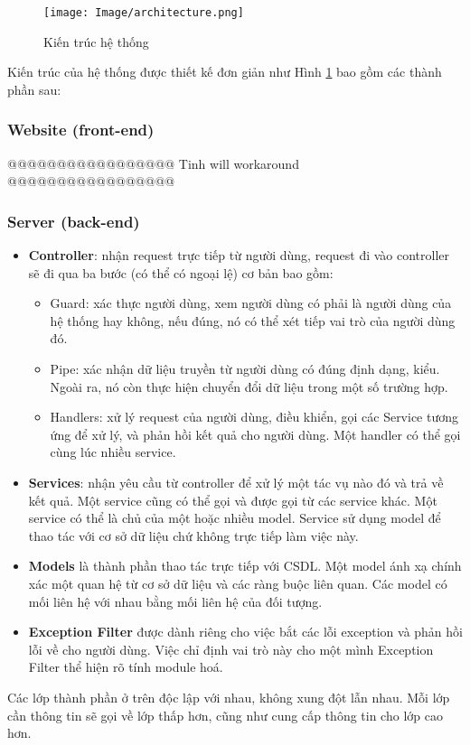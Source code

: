 \begin{figure}[h!]
    \begin{center}
        \texttt{[image: Image/architecture.png]}
        \caption{Kiến trúc hệ thống}
        \label{architecture}
    \end{center}
\end{figure}

Kiến trúc của hệ thống được thiết kế đơn giản như Hình \ref{architecture} bao gồm các thành phần sau:
\subsubsection{Website (front-end)}
@@@@@@@@@@@@@@@@@  Tinh will workaround  @@@@@@@@@@@@@@@@@\par
\subsubsection{Server (back-end)}
\begin{itemize}
    \item \textbf{Controller}: nhận request trực tiếp từ người dùng, request đi vào controller sẽ đi qua ba bước (có thể có ngoại lệ) cơ bản bao gồm:
    \begin{itemize}
        \item Guard: xác thực người dùng, xem người dùng có phải là người dùng của hệ thống hay không, nếu đúng, nó có thể xét tiếp vai trò của người dùng đó.
        \item Pipe: xác nhận dữ liệu truyền từ người dùng có đúng định dạng, kiểu. Ngoài ra, nó còn thực hiện chuyển đổi dữ liệu trong một số trường hợp.
        \item Handlers: xử lý request của người dùng, điều khiển, gọi các Service tương ứng để xử lý, và phản hồi kết quả cho người dùng. Một handler có thể gọi cùng lúc nhiều service.
    \end{itemize}
    
    \item \textbf{Services}: nhận yêu cầu từ controller để xử lý một tác vụ nào đó và trả về kết quả. Một service cũng có thể gọi và được gọi từ các service khác. Một service có thể là chủ của một hoặc nhiều model. Service sử dụng model để thao tác với cơ sở dữ liệu chứ không trực tiếp làm việc này.
    
    \item \textbf{Models} là thành phần thao tác trực tiếp với CSDL. Một model ánh xạ chính xác một quan hệ từ cơ sở dữ liệu và các ràng buộc liên quan. Các model có mối liên hệ với nhau bằng mối liên hệ của đối tượng.
    
    \item \textbf{Exception Filter} được dành riêng cho việc bắt các lỗi exception và phản hồi lỗi về cho người dùng. Việc chỉ định vai trò này cho một mình Exception Filter thể hiện rõ tính module hoá.

\end{itemize}
Các lớp thành phần ở trên độc lập với nhau, không xung đột lẫn nhau. Mỗi lớp cần thông tin sẽ gọi về lớp thấp hơn, cũng như cung cấp thông tin cho lớp cao hơn.

